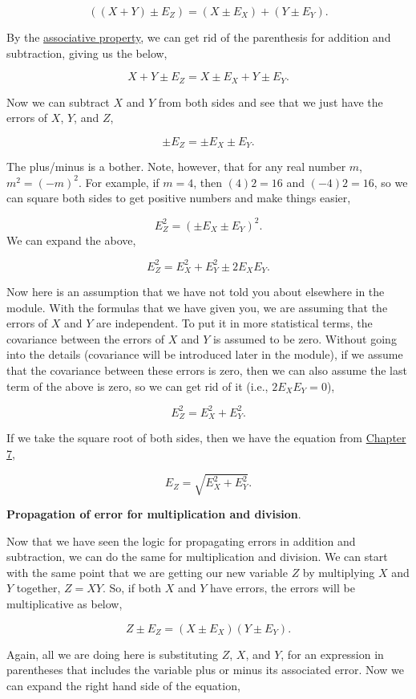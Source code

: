 \documentclass[
]{scrbook}
\begin{document}
\[((X + Y) \pm E_Z) = (X  \pm E_X) + (Y \pm E_Y).\]

By the \href{https://en.wikipedia.org/wiki/Associative_property}{associative property}, we can get rid of the parenthesis for addition and subtraction, giving us the below,

\[X + Y \pm E_Z = X  \pm E_X + Y \pm E_Y.\]

Now we can subtract \(X\) and \(Y\) from both sides and see that we just have the errors of \(X\), \(Y\), and \(Z\),

\[\pm E_Z = \pm E_X \pm E_Y.\]

The plus/minus is a bother. Note, however, that for any real number \(m\), \(m^{2} = (-m)^2\). For example, if \(m = 4\), then \((4)2 = 16\) and \((-4)2 = 16\), so we can square both sides to get positive numbers and make things easier,

\[E_Z^2 = (\pm E_X \pm E_Y)^2.\]
We can expand the above,

\[E_Z^2 = E_X^2 + E_Y^2 \pm2E_X E_Y.\]

Now here is an assumption that we have not told you about elsewhere in the module.
With the formulas that we have given you, we are assuming that the errors of \(X\) and \(Y\) are independent.
To put it in more statistical terms, the covariance between the errors of \(X\) and \(Y\) is assumed to be zero.
Without going into the details (covariance will be introduced later in the module), if we assume that the covariance between these errors is zero, then we can also assume the last term of the above is zero, so we can get rid of it (i.e., \(2E_{X}E_{Y} = 0\)),

\[E_Z^2 = E_X^2 + E_Y^2.\]

If we take the square root of both sides, then we have the equation from \protect\hyperlink{Chapter_7}{Chapter 7},

\[E_Z = \sqrt{E_X^2 + E_Y^2}.\]

\textbf{Propagation of error for multiplication and division}.

Now that we have seen the logic for propagating errors in addition and subtraction, we can do the same for multiplication and division.
We can start with the same point that we are getting our new variable \(Z\) by multiplying \(X\) and \(Y\) together, \(Z = XY\). So, if both \(X\) and \(Y\) have errors, the errors will be multiplicative as below,

\[Z \pm E_Z = (X \pm E_X)(Y \pm E_Y).\]

Again, all we are doing here is substituting \(Z\), \(X\), and \(Y\), for an expression in parentheses that includes the variable plus or minus its associated error.
Now we can expand the right hand side of the equation,
\end{document}
